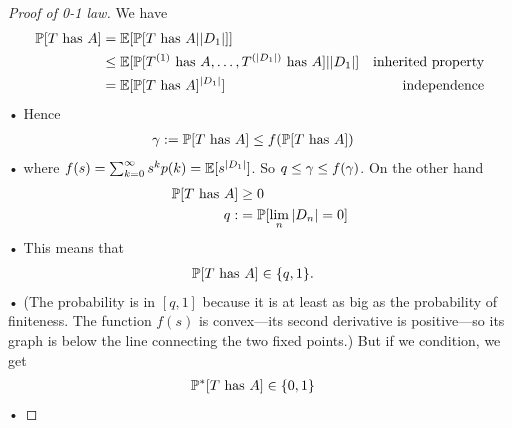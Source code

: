 \begin{proof}[Proof of 0-1 law]
We have
\begin{align*}
\mathbb{P}[T\text{ has }A] &= \mathbb{E}[\mathbb{P}[T\text{ has }A||D_1|]]\\
&\le \mathbb{E}[\mathbb{P}[T^{(1)}\text{ has }A,\ldots, T^{(|D_1|)}\text{ has }A]||D_1|]
&\text{inherited property}\\
&= \mathbb{E}[\mathbb{P}[T\text{ has }A]^{|D_1|}]&\text{independence}
\end{align*}•
Hence 
\begin{align*}
\gamma :=\mathbb{P}[T\text{ has }A] &\le f(\mathbb{P}[T\text{ has }A])
\end{align*}•
where $f(s) =\sum_{k=0}^{\infty} s^kp(k)= \mathbb{E}[s^{|D_1|}]$. 
So $q\le \gamma \le f(\gamma)$.
On the other  hand
\begin{align*}
\mathbb{P}[T\text{ has }A] &\ge 0\\
q:&= \mathbb{P}[\lim_{n} |D_n|=0]
\end{align*}•
This means that 
\begin{align*}
\mathbb{P}[T\text{ has }A] &\in \{q,1\}.
\end{align*}•
(The probability is in $[q,1]$ because it is at least as big as the probability of finiteness. The function $f(s)$ is convex---its second derivative is positive---so its graph is below the line connecting the two fixed points.)
But if we condition, we get
\begin{align*}
\mathbb{P}^*[T\text{ has }A]&\in \{0,1\}
\end{align*}•
\end{proof}













